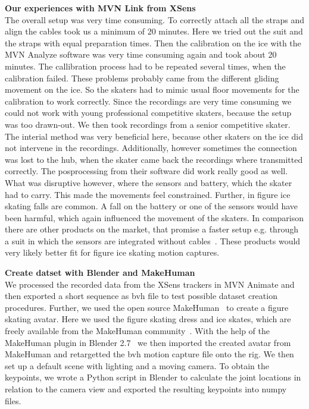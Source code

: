 \textbf{Our experiences with MVN Link from XSens}\\
The overall setup was very time consuming. To correctly attach all the straps and align the cables took us a
minimum of 20 minutes. Here we tried out the suit and the straps with equal preparation times.
Then the calibration on the ice with the MVN Analyze software was very time consuming again and took about 20 minutes.
The callibration process had to be repeated several times, when the calibration failed.
These problems probably came from the different gliding movement on the ice.
So the skaters had to mimic usual floor movements for the calibration to work correctly.
Since the recordings are very time consuming we could not work with young professional competitive skaters, because
the setup was too drawn-out.
We then took recordings from a senior competitive skater. The interial method was very beneficial here, because other
skaters on the ice did not intervene in the recordings. Additionally, however sometimes the connection was lost to
the hub, when the skater came back the recordings where transmitted correctly.
The posprocessing from their software did work really good as well.
What was disruptive however, where the sensors and battery, which the skater had to carry.
This made the movements feel constrained. Further, in figure ice skating falls are common.
A fall on the battery or one of the sensors would have been harmful, which again influenced the movement of the
skaters.
In comparison there are other products on the market, that promise a faster setup e.g. through a suit in which the
sensors
are integrated without cables~\cite{mocapinterialneuron}. These products would very likely better fit for figure ice
skating
motion captures.

\textbf{Create datset with Blender and MakeHuman}\\
We processed the recorded data from the XSens trackers in MVN Animate and then exported a short sequence as bvh file
to test possible dataset creation procedures.
Further, we used the open source MakeHuman~\cite{makehuman} to create a figure skating avatar.
Here we used the figure skating dress and ice skates, which are freely available from the MakeHuman
community~\cite{makehumanassets}.
With the help of the MakeHuman plugin in Blender 2.7~\cite{blender} we then imported the created avatar from MakeHuman
and retargetted the bvh motion capture file onto the rig.
We then set up a default scene with lighting and a moving camera.
To obtain the keypoints, we wrote a Python script in Blender to calculate the joint locations in relation to the camera
view and exported the resulting keypoints into numpy files.

